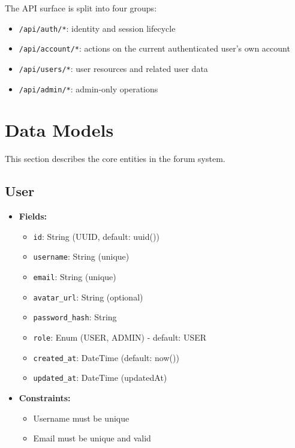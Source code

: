 \documentclass[11pt,a4paper]{article}
\begin{document}
The API surface is split into four groups:
\begin{itemize}
    \item \texttt{/api/auth/*}: identity and session lifecycle
    \item \texttt{/api/account/*}: actions on the current authenticated user's own account
    \item \texttt{/api/users/*}: user resources and related user data
    \item \texttt{/api/admin/*}: admin-only operations
\end{itemize}

\section{Data Models}

This section describes the core entities in the forum system.

\subsection{User}
\begin{itemize}
    \item \textbf{Fields:}
    \begin{itemize}
        \item \texttt{id}: String (UUID, default: uuid())
        \item \texttt{username}: String (unique)
        \item \texttt{email}: String (unique)
        \item \texttt{avatar\_url}: String (optional)
        \item \texttt{password\_hash}: String
        \item \texttt{role}: Enum (USER, ADMIN) - default: USER
        \item \texttt{created\_at}: DateTime (default: now())
        \item \texttt{updated\_at}: DateTime (updatedAt)
    \end{itemize}
    \item \textbf{Constraints:}
    \begin{itemize}
        \item Username must be unique
        \item Email must be unique and valid
    \end{itemize}
\end{itemize}
\end{document}
